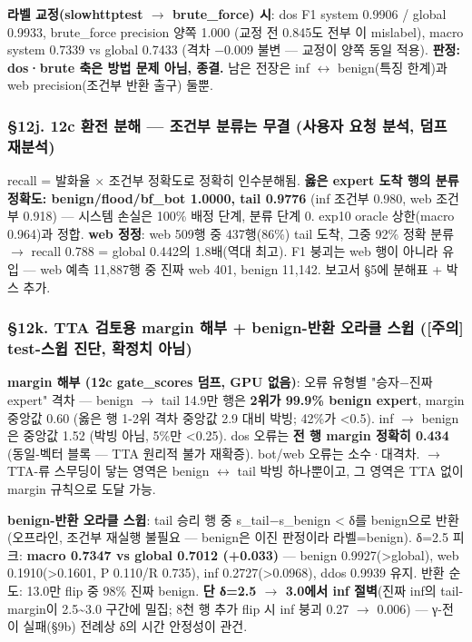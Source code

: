 \textbf{라벨 교정(slowhttptest \ensuremath{\rightarrow} brute\_\allowbreak{}force) 시}: dos F1 system 0.9906 /\allowbreak{} global 0.9933, brute\_\allowbreak{}force precision 양쪽 1.000 (교정 전 0.845도 전부 이 mislabel), macro system 0.7339 vs global 0.7433 (격차 −0.009 불변 — 교정이 양쪽 동일 적용). \textbf{판정: dos·brute 축은 방법 문제 아님, 종결.} 남은 전장은 inf \ensuremath{\leftrightarrow} benign(특징 한계)과 web precision(조건부 반환 출구) 둘뿐.

\subsubsection{§12j. 12c 환전 분해 — 조건부 분류는 무결 (사용자 요청 분석, 덤프 재분석)}
recall =\allowbreak{} 발화율 × 조건부 정확도로 정확히 인수분해됨. \textbf{옳은 expert 도착 행의 분류 정확도: benign/\allowbreak{}flood/\allowbreak{}bf\_\allowbreak{}bot 1.0000, tail 0.9776} (inf 조건부 0.980, web 조건부 0.918) — 시스템 손실은 100\% 배정 단계, 분류 단계 0. exp10 oracle 상한(macro 0.964)과 정합. \textbf{web 정정}: web 509행 중 437행(86\%) tail 도착, 그중 92\% 정확 분류  \ensuremath{\rightarrow}  recall 0.788 =\allowbreak{} global 0.442의 1.8배(역대 최고). F1 붕괴는 web 행이 아니라 유입 — web 예측 11,887행 중 진짜 web 401, benign 11,142. 보고서 §5에 분해표 +\allowbreak{} 박스 추가.

\subsubsection{§12k. TTA 검토용 margin 해부 +\allowbreak{} benign-반환 오라클 스윕 ([주의] test-스윕 진단, 확정치 아님)}
\textbf{margin 해부 (12c gate\_\allowbreak{}scores 덤프, GPU 없음)}: 오류 유형별 "승자−진짜expert" 격차 — benign \ensuremath{\rightarrow} tail 14.9만 행은 \textbf{2위가 99.9\% benign expert}, margin 중앙값 0.60 (옳은 행 1-2위 격차 중앙값 2.9 대비 박빙; 42\%가 <0.5). inf \ensuremath{\rightarrow} benign은 중앙값 1.52 (박빙 아님, 5\%만 <0.25). dos 오류는 \textbf{전 행 margin 정확히 0.434} (동일-벡터 블록 — TTA 원리적 불가 재확증). bot/\allowbreak{}web 오류는 소수·대격차.  \ensuremath{\rightarrow}  TTA-류 스무딩이 닿는 영역은 benign \ensuremath{\leftrightarrow} tail 박빙 하나뿐이고, 그 영역은 TTA 없이 margin 규칙으로 도달 가능.

\textbf{benign-반환 오라클 스윕}: tail 승리 행 중 s\_\allowbreak{}tail−s\_\allowbreak{}benign < δ를 benign으로 반환 (오프라인, 조건부 재실행 불필요 — benign은 이진 판정이라 라벨=\allowbreak{}benign). δ=\allowbreak{}2.5 피크: \textbf{macro 0.7347 vs global 0.7012 (+\allowbreak{}0.033)} — benign 0.9927(>global), web 0.1910(>0.1601, P 0.110/\allowbreak{}R 0.735), inf 0.2727(>0.0968), ddos 0.9939 유지. 반환 순도: 13.0만 flip 중 98\% 진짜 benign. \textbf{단 δ=\allowbreak{}2.5 \ensuremath{\rightarrow} 3.0에서 inf 절벽}(진짜 inf의 tail-margin이 2.5\textasciitilde{}3.0 구간에 밀집; 8천 행 추가 flip 시 inf 붕괴 0.27 \ensuremath{\rightarrow} 0.006) — γ-전이 실패(§9b) 전례상 δ의 시간 안정성이 관건.

